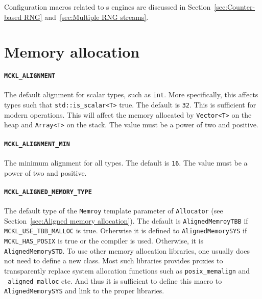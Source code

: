 Configuration macros related to \rng{}s engines are discussed in
Section~\ref{sec:Counter-based RNG} and~\ref{sec:Multiple RNG streams}.

\section{Memory allocation}
\label{sec:Memory allocation}

\paragraph{\texttt{MCKL\_ALIGNMENT}} The default alignment for scalar types,
such as \verb|int|. More specifically, this affects types such that
\verb|std::is_scalar<T>| true. The default is \verb|32|. This is sufficient for
modern \simd operations. This will affect the memory allocated by
\verb|Vector<T>| on the heap and \verb|Array<T>| on the stack. The value must
be a power of two and positive.

\paragraph{\texttt{MCKL\_ALIGNMENT\_MIN}} The minimum alignment for all types.
The default is \verb|16|. The value must be a power of two and positive.

\paragraph{\texttt{MCKL\_ALIGNED\_MEMORY\_TYPE}} The default type of the
\verb|Memroy| template parameter of \verb|Allocator| (see
Section~\ref{sec:Aligned memory allocation}). The default is
\verb|AlignedMemroyTBB| if \verb|MCKL_USE_TBB_MALLOC| is true. Otherwise it is
defined to \verb|AlignedMemorySYS| if \verb|MCKL_HAS_POSIX| is true or the
\msvc compiler is used. Otherwise, it is \verb|AlignedMemorySTD|. To use other
memory allocation libraries, one usually does not need to define a new class.
Most such libraries provides proxies to transparently replace system allocation
functions such as \verb|posix_memalign| and \verb|_aligned_malloc| etc. And
thus it is sufficient to define this macro to \verb|AlignedMemorySYS| and link
to the proper libraries.

